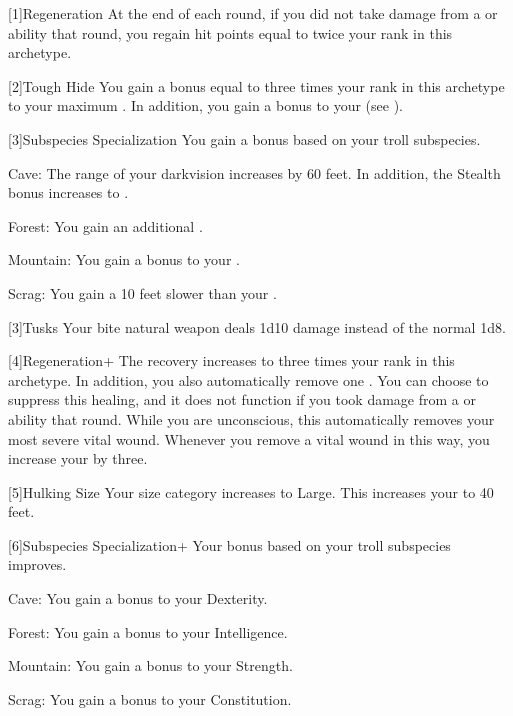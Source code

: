     [1]{Regeneration} At the end of each round, if you did not take damage from a \atAcid or \atFire ability that round, you regain hit points equal to twice your rank in this archetype.

    [2]{Tough Hide} You gain a bonus equal to three times your rank in this archetype to your maximum .
      In addition, you gain a  bonus to your  (see ).

    [3]{Subspecies Specialization} You gain a bonus based on your troll subspecies.
      \begin{raggeditemize}
        \item Cave: The range of your darkvision increases by 60 feet.
          In addition, the Stealth bonus increases to .
        \item Forest: You gain an additional .
        \item Mountain: You gain a  bonus to your .
        \item Scrag: You gain a  10 feet slower than your .
      \end{raggeditemize}

    [3]{Tusks} Your bite natural weapon deals 1d10 damage instead of the normal 1d8.

    [4]{Regeneration+} The recovery increases to three times your rank in this archetype.
      In addition, you also automatically remove one .
      You can choose to suppress this healing, and it does not function if you took damage from a \atAcid or \atFire ability that round.
      While you are unconscious, this automatically removes your most severe vital wound.
      Whenever you remove a vital wound in this way, you increase your  by three.

    [5]{Hulking Size} Your size category increases to Large.
      This increases your  to 40 feet.

    [6]{Subspecies Specialization+} Your bonus based on your troll subspecies improves.
      \begin{raggeditemize}
        \item Cave: You gain a  bonus to your Dexterity.
        \item Forest: You gain a  bonus to your Intelligence.
        \item Mountain: You gain a  bonus to your Strength.
        \item Scrag: You gain a  bonus to your Constitution.
      \end{raggeditemize}

